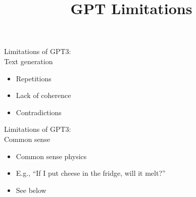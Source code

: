 



\newcommand{\learninggoals}{
\item Understand architectural limitations of GPT-3
\item Understand differences to human learning and thinking}
\def\myblue#1{\textcolor{texblue}{#1}}

\title{GPT Limitations}
\date{}




\begin{vbframe}{Limitations of GPT3:\\ Text generation}

\vfill

  \begin{itemize}
\item Repetitions
\item Lack of coherence
\item Contradictions
    \end{itemize}

\vfill

\end{vbframe}


\begin{vbframe}{Limitations of GPT3:\\ Common sense}

\vfill

  \begin{itemize}
\item Common sense physics
\item E.g., ``If I put cheese in the fridge, will it melt?''
\item See below
    \end{itemize}

\vfill

\end{vbframe}


